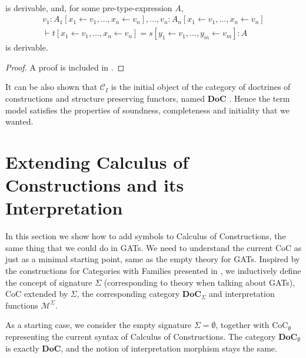 \begin{theorem} 
\begin{enumerate}
\begin{multline*}
              \end{multline*} is derivable,
              and, for some pre-type-expression $A$,
              \begin{multline*}
                    v_1 \colon A_1 [x_1  \leftarrow  v_1, \dots, x_n  \leftarrow  v_n], \dots, v_n \colon A_n[x_1  \leftarrow  v_1, \dots, x_n  \leftarrow  v_n] \\
                \vdash
                    t[x_1  \leftarrow  v_1, \dots, x_n  \leftarrow  v_n] = s[y_1  \leftarrow  v_1, \dots, y_m  \leftarrow  v_m] \colon A
              \end{multline*}
              is derivable.
    \end{enumerate}
\end{theorem}
\begin{proof}
    A proof is included in \cite{streicher}.
\end{proof}

It can be also shown that $\mathcal{C}_I$ is the initial object of the category of doctrines of constructions and 
structure preserving functors, named $\mathbf{DoC}$ \cite{streicher}. Hence the term model satisfies the properties of soundness, 
completeness and initiality that we wanted.

\section[Extending CoC and its Interpretation]{Extending Calculus of Constructions and its \\Interpretation} \label{sect:extending-calculus-of-constructions-and-its-interpretation}

In this section we show how to add symbols to Calculus of Constructions, the same thing that we could do in 
GATs. We need to understand the current CoC as just as a minimal starting point, same as the empty theory for GATs. 
Inspired by the constructions for Categories with Families presented in \cite{bezem2021}, we inductively
define the concept of signature $\Sigma$ (corresponding to theory when talking about GATs), CoC extended by $\Sigma$,
the corresponding category $\mathbf{DoC}_\Sigma$ and interpretation functions $\mathcal{M}^\Sigma$.

As a starting case, we consider the empty signature $\Sigma = \emptyset$, together with $\text{CoC}_\emptyset$
representing the current syntax of Calculus of Constructions. The category $\mathbf{DoC}_\emptyset$ is exactly $\mathbf{DoC}$,
and the notion of interpretation morphism stays the same.

